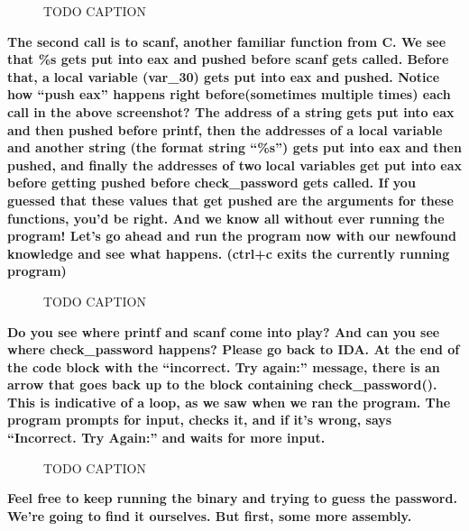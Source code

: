 \documentclass[letterpaper]{article}
\newcommand{\sitfig}[3]{
\begin{figure}[H]
\centering
\makebox[\textwidth][c]{
#2
}
\caption{#3}
\label{#1}
\end{figure}
}
\newcommand{\sitgfx}[4][scale=1.0]{
\sitfig{#3}{\texttt{[image: \#2]}}{#4}
}
\begin{document}
  
\sitgfx[width=6.5in,height=4.611in]{FINALWORKINGDOCFORMERLYPRECURSOR-img014.png}{fig:unk}{TODO CAPTION}
 \textbf{\newline
The second call is to scanf, another familiar function from C. We see that \%s gets put into eax and pushed before scanf
gets called. Before that, a }\textbf{\textcolor[rgb]{0.21960784,0.4627451,0.11372549}{local variable
}}\textbf{(var\_30) gets put into eax and pushed. Notice how ``push eax'' happens right before(sometimes multiple
times) each call in the above screenshot? The address of a string gets put into eax and then pushed before printf, then
the addresses of a local variable and another string (the format string ``\%s'') gets put into eax and then pushed, and
finally the addresses of two }\textbf{\textcolor[rgb]{0.21960784,0.4627451,0.11372549}{local variables }}\textbf{get
put into eax before getting pushed before check\_password gets called. If you guessed that these values that get pushed
are the arguments for these functions, you'd be right. And we know all without ever running the program! Let's go ahead
and run the program now with our newfound knowledge and see what happens. (ctrl+c exits the currently running
program)\newline
}  
\sitgfx[width=6.5in,height=1.139in]{FINALWORKINGDOCFORMERLYPRECURSOR-img015.png}{fig:unk}{TODO CAPTION}
 

\textbf{Do you see where printf and scanf come into play? And can you see where check\_password happens? Please go back
to IDA. At the end of the code block with the ``incorrect. Try again:'' message, there is an arrow that goes back up to
the block containing check\_password(). This is indicative of a loop, as we saw when we ran the program. The program
prompts for input, checks it, and if it's wrong, says ``Incorrect. Try Again:'' and waits for more input.  }
\sitgfx[width=6.5in,height=3.028in]{FINALWORKINGDOCFORMERLYPRECURSOR-img016.png}{fig:unk}{TODO CAPTION}
 \textbf{\newline
Feel free to keep running the binary and trying to guess the password. We're going to find it ourselves. But first, some
more assembly. \newline
}
\end{document}
